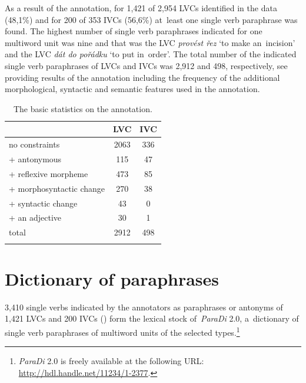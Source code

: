 \documentclass[output=paper,modfonts,nonflat]{langsci/langscibook}
\begin{document}
As a result of the annotation, for 1,421 of 2,954 LVCs identified in the data 
(48,1\%) and for 200 of 353 IVCs (56,6\%) at~least one single verb paraphrase 
was found. The highest number of single verb paraphrases indicated for one 
multiword unit was nine and that was the LVC \textit{provést řez} `to make 
an~incision' and the LVC \textit{dát do pořádku} `to put in~order'. The total 
number of the indicated single verb paraphrases of LVCs and IVCs was 2,912 and 
498, respectively, see  providing results of the annotation 
including the frequency of the additional morphological, syntactic and semantic 
features used in the annotation.

\begin{table}
	
	\begin{tabular}{lcc}
		\lsptoprule
		                       & LVC   & IVC \\ \midrule
		no constraints         & 2063  &  336 \\ \midrule
		 + antonymous          &  115  &     47 \\
		 + reflexive morpheme  &  473  &     85 \\ 
		 + morphosyntactic change      &  270  &  38 \\ 
		 + syntactic change      &    43  &    0 \\  
		 + an adjective        &   30  &   1 \\ \midrule
		total\footnotemark     & 2912   & 498 \\ \lspbottomrule
	\end{tabular}
	\caption{The basic statistics on the annotation.}%
	\label{fig:annotation}
\end{table}


\section{Dictionary of paraphrases}
\label{results}

3,410 single verbs indicated by the annotators as paraphrases or antonyms of 
1,421 LVCs and 200 IVCs () form the lexical stock 
of~\emph{ParaDi} 2.0, a~dictionary of single verb paraphrases of  multiword 
units of the selected types.\footnote{\emph{ParaDi} 2.0 is freely available at 
the following URL: \url{http://hdl.handle.net/11234/1-2377}.} 
\end{document}
